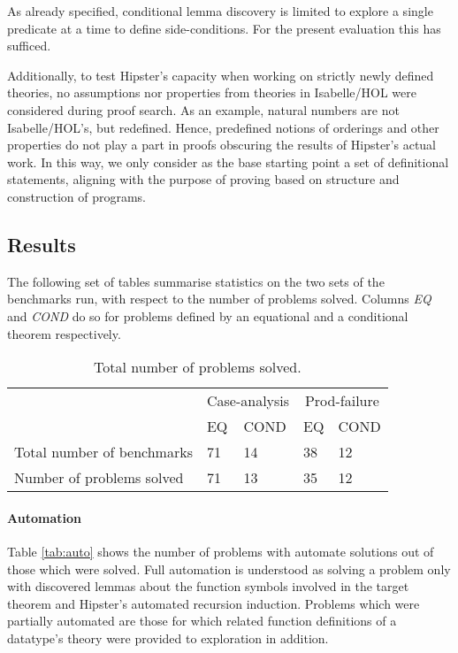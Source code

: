 As already specified, conditional lemma discovery is limited to explore a single predicate at a time to define side-conditions.
%
For the present evaluation this has sufficed.

Additionally, to test Hipster's capacity when working on strictly newly defined theories, no assumptions nor properties from theories in Isabelle/HOL were considered during proof search.
%
As an example, natural numbers are not Isabelle/HOL's, but redefined.
%
Hence, predefined notions of orderings and other properties do not play a part in proofs obscuring the results of Hipster's actual work.
%
In this way, we only consider as the base starting point a set of definitional statements, aligning with the purpose of proving based on structure and construction of programs.


\subsection{Results}

The following set of tables summarise statistics on the two sets of the benchmarks run, with respect to the number of problems solved.
%
Columns \emph{EQ} and \emph{COND} do so for problems defined by an equational and a conditional theorem respectively.

\noindent \begin{table}[htbp]
\begin{tabularx}{\textwidth}{l | X X | X X}
  & \multicolumn{2}{c|}{Case-analysis} & \multicolumn{2}{c}{Prod-failure} \\
  &  EQ & COND & EQ & COND \\
  \hline
  Total number of benchmarks & 71 & 14 & 38 & 12 \\
  Number of problems solved & 71 & 13 & 35 & 12 \\
\end{tabularx}
\caption{Total number of problems solved.}
\label{tab:total}
\end{table}


\paragraph{Automation}
%
Table \ref{tab:auto} shows the number of problems with automate solutions out of those which were solved.
%
Full automation is understood as solving a problem only with discovered lemmas about the function symbols involved in the target theorem and Hipster's automated recursion induction.
%
Problems which were partially automated are those for which related function definitions of a datatype's theory were provided to exploration in addition.

